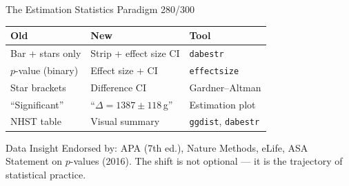 \documentclass[10pt]{beamer}
\newcommand{\smark}[1]{\hfill{\scriptsize\color{codegray}#1}}
\begin{document}
\begin{frame}{The Estimation Statistics Paradigm}
\smark{280/300}
\centering\small
\begin{tabular}{@{}lll@{}}
    \toprule
    \textbf{Old} & \textbf{New} & \textbf{Tool} \\
    \midrule
    Bar + stars only          & Strip + effect size CI     & \texttt{dabestr} \\
    $p$-value (binary)        & Effect size + CI           & \texttt{effectsize} \\
    Star brackets             & Difference CI              & Gardner--Altman \\
    ``Significant''           & ``$\Delta = 1387 \pm 118$\,g'' & Estimation plot \\
    NHST table                & Visual summary             & \texttt{ggdist}, \texttt{dabestr} \\
    \bottomrule
\end{tabular}

\vspace{0.3cm}
\begin{exampleblock}{Data Insight}
    \scriptsize Endorsed by: APA (7th ed.), Nature Methods, eLife, ASA Statement on $p$-values (2016). The shift is not optional --- it is the trajectory of statistical practice.
\end{exampleblock}
\end{frame}
\end{document}
